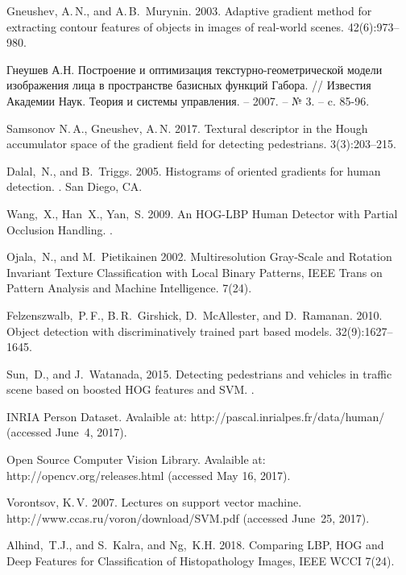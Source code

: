 \documentclass[12pt,twoside]{article}
\begin{document}
\begin{thebibliography}{99}
Gneushev, A.\,N., and A.\,B.~Murynin.	
2003. Adaptive gradient method for extracting contour features of
objects in images of real-world scenes.
 42(6):973--980.

Гнеушев А.Н. Построение и оптимизация текстурно-геометрической модели изображения лица в пространстве базисных функций Габора. // Известия Академии Наук. Теория и системы управления. – 2007. – № 3. – c. 85-96.

Samsonov N.\,A., Gneushev, A.\,N.	
2017. Textural descriptor in the Hough accumulator space of the gradient field for detecting pedestrians.
 3(3):203--215.

Dalal,~N., and B.~Triggs. 2005.
 Histograms of oriented gradients for
human detection. . San Diego, CA.

Wang,~X., Han~X., Yan,~S. 2009.
 An HOG-LBP Human Detector with Partial Occlusion Handling. .

Ojala,~N., and M.~Pietikainen 2002.
 Multiresolution Gray-Scale and Rotation Invariant Texture Classification with Local Binary Patterns, IEEE Trans on Pattern Analysis and Machine Intelligence.
 7(24).
 
	{Felzenszwalb,~P.\,F., B.\,R.~Girshick, D.~McAllester,
	and D.~Ramanan}. 2010.
	Object detection with discriminatively trained part based models.
 32(9):1627--1645.

	{Sun,~D., and J.~Watanada}, 2015.
	Detecting pedestrians and vehicles in traffic scene based on
	boosted HOG features and SVM.
.

	INRIA Person Dataset.
	Avalaible at: {\sf http://pascal.inrialpes.fr/data/human/}
	(accessed June~4, 2017).

	Open Source Computer Vision Library.
	Avalaible at: {\sf http://opencv.org/releases.html}
	(accessed May 16, 2017).
	
	Vorontsov, K.\,V. 2007. Lectures on support vector machine.
	{\sf http://www.ccas.ru/voron/download/\linebreak SVM.pdf}
	(accessed June~25, 2017).
	
Alhind,~T.J., and  S.~Kalra, and Ng,~K.H. 2018.
 Comparing LBP, HOG and Deep Features for Classification of Histopathology Images, IEEE WCCI
 7(24).

\end{thebibliography}

\end{document}
